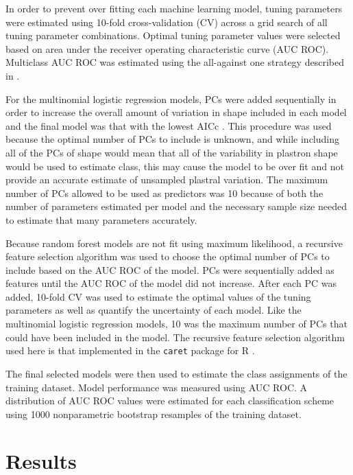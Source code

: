 \documentclass[12pt]{article}\usepackage{graphicx, color}
\begin{document}
In order to prevent over fitting each machine learning model, tuning parameters were estimated using 10-fold cross-validation (CV) across a grid search of all tuning parameter combinations. Optimal tuning parameter values were selected based on area under the receiver operating characteristic curve (AUC ROC). Multiclass AUC ROC was estimated using the all-against one strategy described in \citet{Hand2001}.

For the multinomial logistic regression models, PCs were added sequentially in order to increase the overall amount of variation in shape included in each model and the final model was that with the lowest AICc \cite{Burnham2002a}. This procedure was used because the optimal number of PCs to include is unknown, and while including all of the PCs of shape would mean that all of the variability in plastron shape would be used to estimate class, this may cause the model to be over fit and not provide an accurate estimate of unsampled plastral variation. The maximum number of PCs allowed to be used as predictors was 10 because of both the number of parameters estimated per model and the necessary sample size needed to estimate that many parameters accurately. 

Because random forest models are not fit using maximum likelihood, a recursive feature selection algorithm was used to choose the optimal number of PCs to include based on the AUC ROC of the model. PCs were sequentially added as features until the AUC ROC of the model did not increase. After each PC was added, 10-fold CV was used to estimate the optimal values of the tuning parameters as well as quantify the uncertainty of each model. Like the multinomial logistic regression models, 10 was the maximum number of PCs that could have been included in the model. The recursive feature selection algorithm used here is that implemented in the \texttt{caret} package for R \citep{Kuhn2013}.

The final selected models were then used to estimate the class assignments of the training dataset. Model performance was measured using AUC ROC. A distribution of AUC ROC values were estimated for each classification scheme using 1000 nonparametric bootstrap resamples of the training dataset.

\section{Results}
\end{document}
